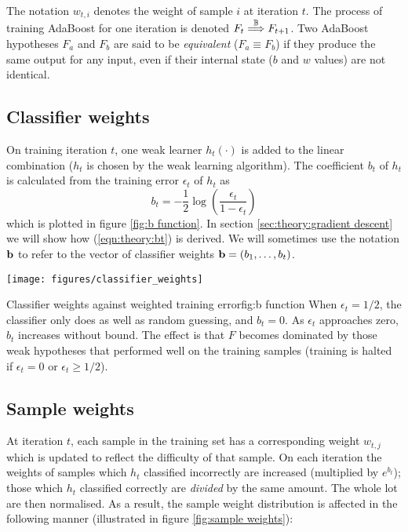 The notation $w_{t,i}$ denotes the weight of sample $i$ at iteration
$t$.  The process of training AdaBoost for one iteration is denoted $F_t
\stackrel{\mathbb{B}}{\Longrightarrow} F_{t+1}$.   Two AdaBoost hypotheses $F_a$ and $F_b$ are
said to be \emph{equivalent} ($F_a \equiv F_b$) if they produce the
same output for any input, even if their internal state ($b$ and $w$
values) are not identical.

\subsection{Classifier weights}
\label{sec:classifier weights}

On training iteration $t$, one weak learner $h_t(\cdot)$ is added to
the linear combination ($h_t$ is chosen by the weak learning
algorithm).  The coefficient $b_t$ of $h_t$ is calculated from the 
training error $\epsilon_t$ of $h_t$ as 
%
\begin{equation}
b_t = - \frac{1}{2} \log \left( \frac{\epsilon_t}{1 - \epsilon_t} \right)
\label{eqn:theory:bt}
\end{equation}
%
which is plotted in figure \ref{fig:b function}.  In section
\ref{sec:theory:gradient descent} we will show how
(\ref{eqn:theory:bt}) is derived.  We will sometimes use the notation
$\mathbf{b}$ to refer to the vector of classifier weights $\mathbf{b} = (b_1,
\ldots, b_t)$.

\begin{linefigure}
\begin{center}
\texttt{[image: figures/classifier\_weights]}
\end{center}
\begin{capt}{Classifier weights against weighted training error}{fig:b
function}
When $\epsilon_t = 1/2$, the classifier only does as well as random
guessing, and $b_t = 0$.  As $\epsilon_t$ approaches zero, $b_t$
increases without bound.  The effect is that $F$ becomes dominated by
those weak hypotheses that performed well on the training samples
(training is halted if $\epsilon_t = 0$ or $\epsilon_t \geq
1/2$).
\end{capt}
\end{linefigure}


\subsection{Sample weights}
\label{sec:sample weights}

At iteration $t$, each sample in the training set has a corresponding
weight $w_{t,j}$ which is updated to reflect the difficulty of that
sample.  On each iteration the weights of samples which $h_t$
classified incorrectly are increased (multiplied by $e^{b_t}$); those
which $h_t$ classified correctly are \emph{divided} by the same
amount.  The whole lot are then normalised. As a result, the sample
weight distribution is affected in the following manner (illustrated
in figure \ref{fig:sample weights}): 

